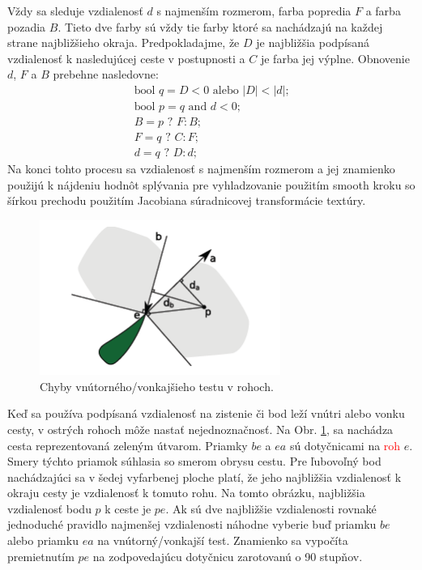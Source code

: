Vždy sa sleduje vzdialenosť \(d\) s najmenším rozmerom, farba popredia \(F\) a farba pozadia \(B\). Tieto dve farby sú vždy tie farby ktoré sa nachádzajú na každej strane najbližšieho okraja. Predpokladajme, že \(D\) je najbližšia podpísaná vzdialenosť k nasledujúcej ceste v postupnosti a \(C\) je farba jej výplne. Obnovenie \(d\), \(F\) a \(B\) prebehne nasledovne:
\begin{displaymath}
\begin{array} {l}
\text{bool } q = D < 0 \text{ alebo } |D| < |d|\text{;} \\
\text{bool } p = q \text{ and } d < 0; \\
B = p \text{ ? } F : B\text{;} \\
F = q \text{ ? } C : F\text{;} \\
d = q \text{ ? } D : d\text{;}
\end{array}
\end{displaymath}
Na konci tohto procesu sa vzdialenosť s najmenším rozmerom a jej znamienko použijú k nájdeniu hodnôt splývania pre vyhladzovanie použitím smooth kroku so šírkou prechodu použitím Jacobiana súradnicovej transformácie textúry.
\begin{figure}[H]
\begin{center}
\includegraphics[width=0.7\textwidth]{images/path_compositing_1}
\caption{Chyby vnútorného/vonkajšieho testu v rohoch. \cite{qmk08}}
\label{img:path_compositing_1}
\end{center}
\end{figure}

Keď sa používa podpísaná vzdialenosť na zistenie či bod leží vnútri alebo vonku cesty, v ostrých rohoch môže nastať nejednoznačnosť. Na Obr. \ref{img:path_compositing_1}, sa nachádza cesta reprezentovaná zeleným útvarom. Priamky \(be\) a \(ea\) sú dotyčnicami na \textcolor{red}{roh} \(e\). Smery týchto priamok súhlasia so smerom obrysu cestu. Pre ľubovoľný bod nachádzajúci sa v šedej vyfarbenej ploche platí, že jeho najbližšia vzdialenosť k okraju cesty je vzdialenosť k tomuto rohu. Na tomto obrázku, najbližšia vzdialenosť bodu \(p\) k ceste je \(pe\). Ak sú dve najbližšie vzdialenosti rovnaké jednoduché pravidlo najmenšej vzdialenosti náhodne vyberie buď priamku \(be\) alebo priamku \(ea\) na vnútorný/vonkajší test. Znamienko sa vypočíta premietnutím \(pe\) na zodpovedajúcu dotyčnicu zarotovanú o 90 stupňov.

